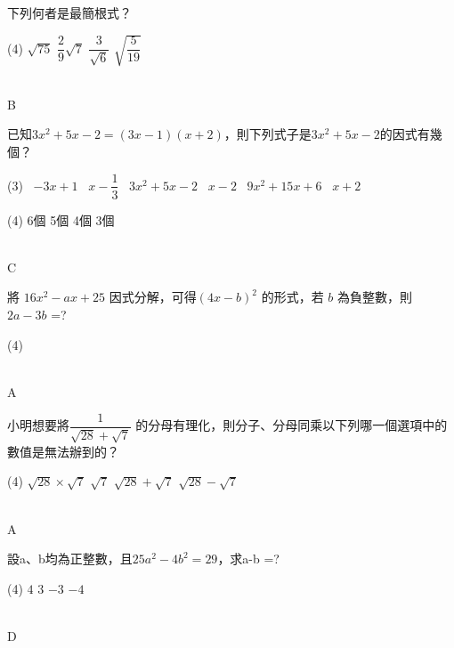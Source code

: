 \documentclass
[answers]
{exam}
\theoremstyle{definition}
\newif\ifyr\yrfalse %
\newcommand{\yr}[1]{\ifyr\relax\else #1\fi}
\newif\ifsho\shofalse %
\newcommand{\sho}[1]{\ifsho\relax\else\rightline{【#1】}\fi}
\begin{document}
\begin{questions}


\question
下列何者是最簡根式？
\begin{tasks}(4)
	\task $\sqrt{75}$
	\task $\dfrac{2}{9}\sqrt{7}$
	\task $\dfrac{3}{\sqrt{6}}$
	\task $\sqrt{\dfrac{5}{19}}$
\end{tasks}
\begin{solution}~\\
	B
\end{solution}


\question
已知$3x^2 + 5x -2 =(3x-1)(x+2)$，則下列式子是$3x^2+5x-2$的因式有幾個？
\begin{tasks}(3)
	\task[(甲)] \ $-3x+1$
	\task[(乙)] \ $x-\dfrac{1}{3}$
	\task[(丙)] \ $3x^2+5x-2$
	\task[(丁)] \ $x-2$
	\task[(戊)] \ $9x^2+15x+6$
	\task[(己)] \ $x+2$
\end{tasks}
\begin{tasks}(4)
	\task 6個
	\task 5個
	\task 4個
	\task 3個
\end{tasks}
\begin{solution}~\\
	C
\end{solution}

\question
將 $16x^2-ax+25$ 因式分解，可得$(4x-b)^2$ 的形式，若 $b$ 為負整數，則 $2a-3b$ =?
\begin{tasks}(4)
\end{tasks}
\begin{solution}~\\
	A
\end{solution}

\question
小明想要將$\dfrac{1}{\sqrt{28}+\sqrt{7}}$ 的分母有理化，則分子、分母同乘以下列哪一個選項中的數值是無法辦到的？
\begin{tasks}(4)
	\task $\sqrt{28}\times\sqrt{7}$
	\task $\sqrt{7}$
	\task $\sqrt{28}+\sqrt{7}$
	\task $\sqrt{28}-\sqrt{7}$
\end{tasks}
\begin{solution}~\\
	A
\end{solution}


\question
設a、b均為正整數，且$25a^2-4b^2=29$，求a-b =?

\begin{tasks}(4)
	\task $4$
	\task $3$
	\task $-3$
	\task $-4$
\end{tasks}

\begin{solution}~\\
	D
\end{solution}


\end{questions}
\end{document}
